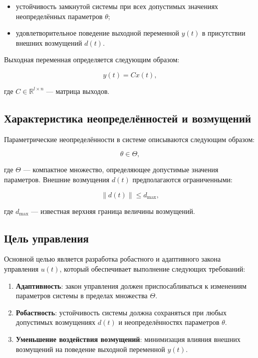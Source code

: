 \documentclass[a4paper,14pt]{extarticle} %
\begin{document}
\begin{itemize}
    \item устойчивость замкнутой системы при всех допустимых значениях неопределённых параметров \( \theta \);
    \item удовлетворительное поведение выходной переменной \( y(t) \) в присутствии внешних возмущений \( d(t) \).
\end{itemize}

Выходная переменная определяется следующим образом:

\begin{equation}
    y(t) = Cx(t),
\end{equation}

где \( C \in \mathbb{R}^{l \times n} \) — матрица выходов.

\subsection*{Характеристика неопределённостей и возмущений}

Параметрические неопределённости в системе описываются следующим образом:

\begin{equation}
    \theta \in \Theta,
\end{equation}

где \( \Theta \) — компактное множество, определяющее допустимые значения параметров. Внешние возмущения \( d(t) \) предполагаются ограниченными:

\begin{equation}
    \|d(t)\| \leq d_{\max},
\end{equation}

где \( d_{\max} \) — известная верхняя граница величины возмущений.

\subsection*{Цель управления}

Основной целью является разработка робастного и адаптивного закона управления \( u(t) \), который обеспечивает выполнение следующих требований:

\begin{enumerate}
    \item \textbf{Адаптивность}: закон управления должен приспосабливаться к изменениям параметров системы в пределах множества \( \Theta \).
    \item \textbf{Робастность}: устойчивость системы должна сохраняться при любых допустимых возмущениях \( d(t) \) и неопределённостях параметров \( \theta \).
    \item \textbf{Уменьшение воздействия возмущений}: минимизация влияния внешних возмущений на поведение выходной переменной \( y(t) \).
\end{enumerate}
\end{document}
